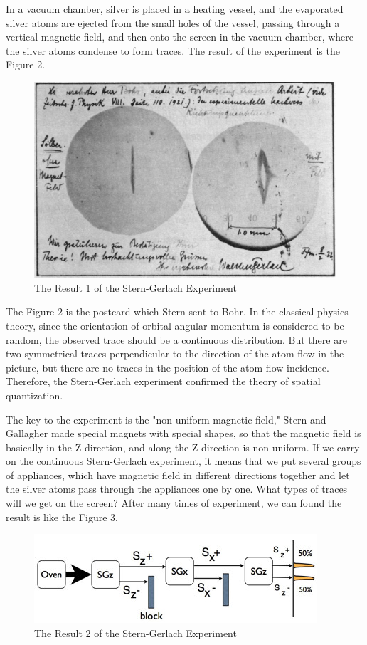 \documentclass[a4paper]{article}
\begin{document}
In a vacuum chamber, silver is placed in a heating vessel, and the evaporated silver atoms are ejected from the small holes of the vessel, passing through a vertical magnetic field, and then onto the screen in the vacuum chamber, where the silver atoms condense to form traces. The result of the experiment is the Figure 2.

\begin{figure}[htbp!] \label{1st result}
\centering %
    \includegraphics[width=0.8\linewidth]{1st.jpg}
    \caption{The Result 1 of the Stern-Gerlach Experiment}
\end{figure}

The Figure 2 is the postcard which Stern sent to Bohr. In the classical physics theory, since the orientation of orbital angular momentum is considered to be random, the observed trace should be a continuous distribution. But there are two symmetrical traces perpendicular to the direction of the atom flow in the picture, but there are no traces in the position of the atom flow incidence. Therefore, the Stern-Gerlach experiment confirmed the theory of spatial quantization.
\cite{FeynmanR.P.Leighton2005}

The key to the experiment is the "non-uniform magnetic field," Stern and Gallagher made special magnets with special shapes, so that the magnetic field is basically in the Z direction, and along the Z direction is non-uniform. If we carry on the continuous Stern-Gerlach experiment, it means that we put several groups of appliances, which have magnetic field in different directions together and let the silver atoms pass through the appliances one by one. What types of traces will we get on the screen? After many times of experiment, we can found the result is like the Figure 3.

\begin{figure}[htbp!] \label{2nd result}
\centering %
    \includegraphics[width=0.8\linewidth]{2nd.jpg}
    \caption{The Result 2 of the Stern-Gerlach Experiment}
\end{figure}
\end{document}

